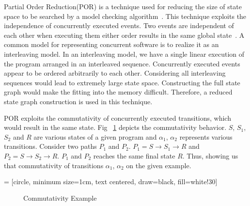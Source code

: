 Partial Order Reduction(POR) is a technique used for reducing the size of state space to be searched by a model checking algorithm~\citep{por10yrs}. 
This technique exploits the independence of concurrently executed events. 
Two events are independent of each other when executing them either order results in the same global state~\citep{model_check}. 
A common model for representing concurrent software is to realize it as an interleaving model. 
In an interleaving model, we have a single linear execution of the program arranged in an interleaved sequence. 
Concurrently executed events appear to be ordered arbitrarily to each other. 
Considering all interleaving sequences would lead to extremely large state space. 
Constructing the full state graph would make the fitting into the memory difficult. 
Therefore, a reduced state graph construction is used in this technique. 
 
POR exploits the commutativity of concurrently executed transitions, which would result in the same state. 
Fig ~\ref{commutativity_example} depicts the commutativity behavior. 
$S$, $S_1$, $S_2$ and $R$ are various states of a given program and $\alpha_1$, $\alpha_2$ represents various transitions. 
Consider two paths $P_1$ and $P_2$. 
$P_1 = S \rightarrow S_1 \rightarrow  R$ and $P_2 = S \rightarrow S_2 \rightarrow  R$. 
$P_1$ and $P_2$ reaches the same final state $R$. 
Thus, showing us that commutativity of transitions $\alpha_1$, $\alpha_2$ on the given example. 





 = [circle, minimum size=1cm, text centered, draw=black, fill=white!30]

\begin{figure}[h]
\centering
{}
\caption{Commutativity Example}
\label{commutativity_example}
\end{figure}

